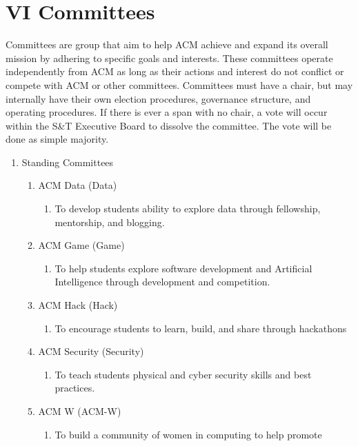 
\section{VI \textendash{} Committees}
Committees are group that aim to help ACM achieve and expand its overall mission
by adhering to specific goals and interests. These committees operate
independently from ACM as long as their actions and interest do not conflict or
compete with ACM or other committees. Committees must have a chair, but may
internally have their own election procedures, governance structure, and
operating procedures. If there is ever a span with no chair, a vote will occur
within the S\&T Executive Board to dissolve the committee. The vote will be done
as simple majority.
\begin{enumerate}[label=\Alph*.]
  \item Standing Committees
    \begin{enumerate}
      \item ACM Data (Data)
        \begin{enumerate}
          \item To develop students ability to explore data through fellowship,
            mentorship, and blogging.
        \end{enumerate}
      \item ACM Game (Game)
        \begin{enumerate}
          \item To help students explore software development and Artificial
            Intelligence through development and competition.
        \end{enumerate}
      \item ACM Hack (Hack)
        \begin{enumerate}
          \item To encourage students to learn, build, and share through
            hackathons
        \end{enumerate}
      \item ACM Security (Security)
        \begin{enumerate}
          \item To teach students physical and cyber security skills and best
            practices.
        \end{enumerate}
      \item ACM W (ACM-W)
        \begin{enumerate}
          \item To build a community of women in computing to help promote

\end{enumerate}
\end{enumerate}
\end{enumerate}
